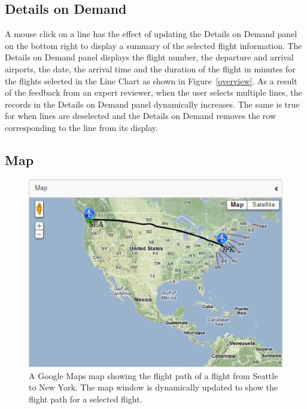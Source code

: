\documentclass{sig-alternate}
\begin{document}
\subsection{Details on Demand}
\label{subsec-details}
A mouse click on a line has the effect of updating the Details on Demand panel
on the bottom right to display a summary of the selected flight information.
The Details on Demand panel displays the flight number, the departure and arrival
airports, the date, the arrival time and the duration of the flight in minutes for the flights 
selected in the Line Chart as shown in Figure~\ref{overview}.
 As a result of the feedback from an expert reviewer, when
the user selects multiple lines, the records in the Details on Demand panel 
dynamically increases. The same is true for when lines are deselected and the 
Details on Demand removes the row corresponding to the line from its display.  

\subsection{Map}
\label{subsec-map}
\begin{figure}
\centering
\includegraphics[width=\columnwidth]{figs/map.eps}
\caption{
	A Google Maps map showing the flight path of a flight from Seattle to New York.
The map window is dynamically updated to show the flight path for a selected 
flight.}
\label{map}
\end{figure}
\end{document}
